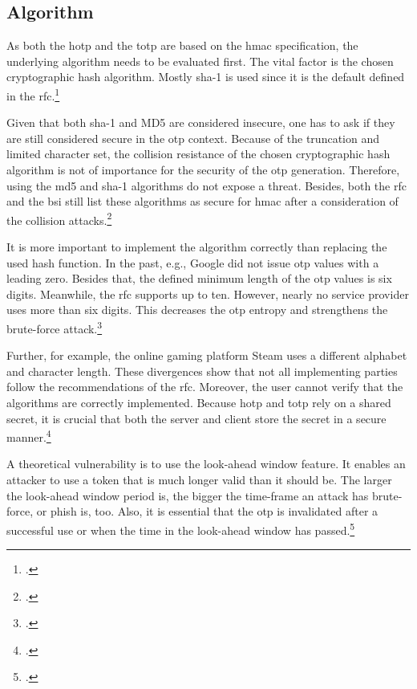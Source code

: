\subsection{Algorithm}

As both the \gls{hotp} and the \gls{totp} are based on the \gls{hmac} specification, the underlying algorithm needs to be evaluated first. The vital factor is the chosen cryptographic hash algorithm. Mostly \gls{sha}-1 is used since it is the default defined in the \gls{rfc}.\footcite[See][3]{m2011rfc}

Given that both \gls{sha}-1 and MD5 are considered insecure, one has to ask if they are still considered secure in the \gls{otp} context. Because of the truncation and limited character set, the collision resistance of the chosen cryptographic hash algorithm is not of importance for the security of the \gls{otp} generation. Therefore, using the \gls{md}5 and \gls{sha}-1 algorithms do not expose a threat. Besides, both the \gls{rfc} and the \gls{bsi} still list these algorithms as secure for \gls{hmac} after a consideration of the collision attacks.\footcites[See][]{10.1007/978-3-319-63688-7_19}[See][18]{bsi2019recommendations}[See][2]{s2011rfc}[See][395]{eckert-it-sec-9}

It is more important to implement the algorithm correctly than replacing the used hash function. In the past, e.g., Google did not issue \gls{otp} values with a leading zero. Besides that, the defined minimum length of the \gls{otp} values is six digits. Meanwhile, the \gls{rfc} supports up to ten. However, nearly no service provider uses more than six digits. This decreases the \gls{otp} entropy and strengthens the brute-force attack.\footcites[See][369]{10.1007/978-3-662-45472-5_24}

Further, for example, the online gaming platform Steam uses a different alphabet and character length. These divergences show that not all implementing parties follow the recommendations of the \gls{rfc}. Moreover, the user cannot verify that the algorithms are correctly implemented. Because \gls{hotp} and \gls{totp} rely on a shared secret, it is crucial that both the server and client store the secret in a secure manner.\footcites[See][6--7]{steam-totp}[See][11--13]{m2005rfc}

A theoretical vulnerability is to use the look-ahead window feature. It enables an attacker to use a token that is much longer valid than it should be. The larger the look-ahead window period is, the bigger the time-frame an attack has brute-force, or phish is, too. Also, it is essential that the \gls{otp} is invalidated after a successful use or when the time in the look-ahead window has passed.\footcites[See][369]{10.1007/978-3-662-45472-5_24}[See][11]{m2005rfc}

